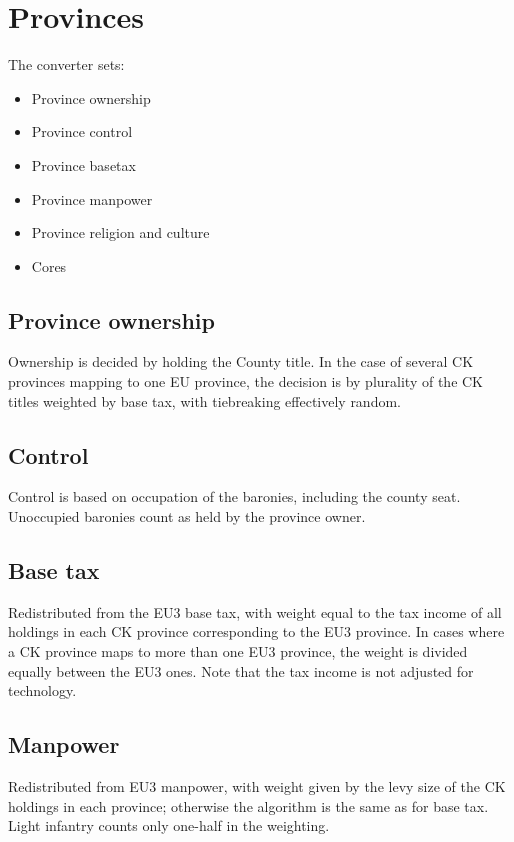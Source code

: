 \documentclass[12pt,ebook,oneside]{book}
\begin{document}
\chapter{Provinces}
The converter sets:
\begin{itemize}
\item Province ownership
\item Province control
\item Province basetax
\item Province manpower 
\item Province religion and culture
\item Cores
\end{itemize}

\section{Province ownership}

Ownership is decided by holding the County title. In the case
of several CK provinces mapping to one EU province, the decision
is by plurality of the CK titles weighted by base tax, with 
tiebreaking effectively random.

\section{Control}

Control is based on occupation of the baronies, including the
county seat. Unoccupied baronies count as held by the province 
owner. 

\section{Base tax}

Redistributed from the EU3 base tax, with weight equal to
the tax income of all holdings in each CK province corresponding
to the EU3 province. In cases where a CK province maps to more
than one EU3 province, the weight is divided equally between the
EU3 ones. Note that the tax income is not adjusted for technology. 

\section{Manpower}

Redistributed from EU3 manpower, with weight given by the levy
size of the CK holdings in each province; otherwise the algorithm
is the same as for base tax. Light infantry counts only
one-half in the weighting. 
\end{document}
